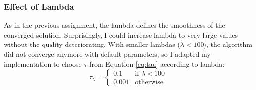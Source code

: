 \documentclass{paper}
\begin{document}
\subsubsection*{Effect of Lambda}
As in the previous assignment, the lambda defines the smoothness of the converged
solution. Surprisingly, I could increase lambda to very large values without the quality deteriorating.
With smaller lambdas ($ \lambda < 100 $), the algorithm did not converge anymore
with default parameters, so I adapted my implementation to choose 
$\tau$ from Equation \ref{eq:tau} according to lambda:
\begin{equation}
	\tau_\lambda = 
	\begin{cases} 
		0.1 &\mbox{if } \lambda < 100 \\ 
		0.001 & \mbox{otherwise } 
	\end{cases}
\end{equation}
\end{document}
